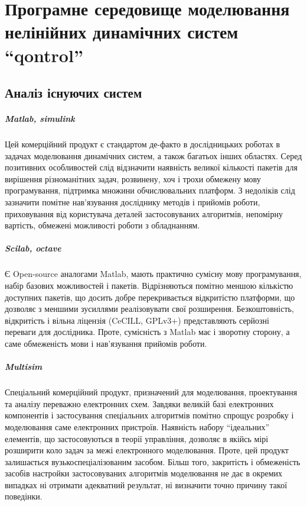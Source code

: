 \chapter{Програмне середовище моделювання нелінійних динамічних систем ``qontrol''}
\label{chapter_qontrol}

\section{Аналіз існуючих систем}%

\paragraph{Matlab, simulink}

Цей комерційний продукт є стандартом де-факто в дослідницьких
роботах в задачах моделювання динамічних систем, а також
багатьох інших областях. Серед позитивних особливостей слід
відзначити наявність великої кількості пакетів для вирішення
різноманітних задач, розвинену, хоч і трохи обмежену мову
програмування, підтримка множини обчислювальних платформ. З
недоліків слід зазначити помітне нав'язування досліднику
методів і прийомів роботи, приховування від користувача деталей
застосовуваних алгоритмів, непомірну вартість, обмежені
можливості роботи з обладнанням.


\paragraph{Scilab, octave}

Є Open-source аналогами Matlab, мають практично сумісну
мову програмування, набір базових можливостей і
пакетів. Відрізняються помітно меншою кількістю доступних
пакетів, що досить добре перекривається відкритістю
платформи, що дозволяє з меншими зусиллями реалізовувати свої
розширення. Безкоштовність, відкритість і вільна ліцензія (CeCILL,
GPLv3+) представляють серйозні переваги для дослідника. Проте,
сумісність з Matlab має і зворотну сторону, а саме обмеженість
мови і нав'язування прийомів роботи.

\paragraph{Multisim}

Спеціальний комерційний продукт, призначений для моделювання,
проектування та аналізу переважно електронних схем. Завдяки
великій базі електронних компонентів і застосування
спеціальних алгоритмів помітно спрощує розробку і моделювання
саме електронних пристроїв. Наявність набору ``ідеальних''
елементів, що застосовуються в теорії управління,
дозволяє в якійсь мірі розширити коло задач за межі
електронного моделювання. Проте, цей продукт залишається
вузькоспеціалізованим засобом. Більш того, закритість і
обмеженість засобів настройки застосовуваних алгоритмів
моделювання не дає в окремих випадках ні отримати адекватний
результат, ні визначити точно причину такої поведінки.

